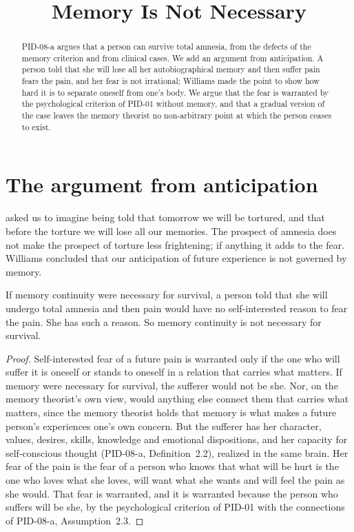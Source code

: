 \documentclass{situationist-preprint}
\title{Memory Is Not Necessary}
\begin{document}
\maketitle

\begin{abstract}
PID-08-a argues that a person can survive total amnesia, from the defects of the memory criterion and from clinical cases. We add an argument from anticipation. A person told that she will lose all her autobiographical memory and then suffer pain fears the pain, and her fear is not irrational; Williams made the point to show how hard it is to separate oneself from one's body. We argue that the fear is warranted by the psychological criterion of PID-01 without memory, and that a gradual version of the case leaves the memory theorist no non-arbitrary point at which the person ceases to exist.
\end{abstract}

\section{The argument from anticipation}

\citet{Williams1970} asked us to imagine being told that tomorrow we will be tortured, and that before the torture we will lose all our memories. The prospect of amnesia does not make the prospect of torture less frightening; if anything it adds to the fear. Williams concluded that our anticipation of future experience is not governed by memory.

\begin{proposition}\label{p:fear}
If memory continuity were necessary for survival, a person told that she will undergo total amnesia and then pain would have no self-interested reason to fear the pain. She has such a reason. So memory continuity is not necessary for survival.
\end{proposition}

\begin{proof}
Self-interested fear of a future pain is warranted only if the one who will suffer it is oneself or stands to oneself in a relation that carries what matters. If memory were necessary for survival, the sufferer would not be she. Nor, on the memory theorist's own view, would anything else connect them that carries what matters, since the memory theorist holds that memory is what makes a future person's experiences one's own concern. But the sufferer has her character, values, desires, skills, knowledge and emotional dispositions, and her capacity for self-conscious thought (PID-08-a, Definition~2.2), realized in the same brain. Her fear of the pain is the fear of a person who knows that what will be hurt is the one who loves what she loves, will want what she wants and will feel the pain as she would. That fear is warranted, and it is warranted because the person who suffers will be she, by the psychological criterion of PID-01 with the connections of PID-08-a, Assumption~2.3.
\end{proof}
\end{document}
